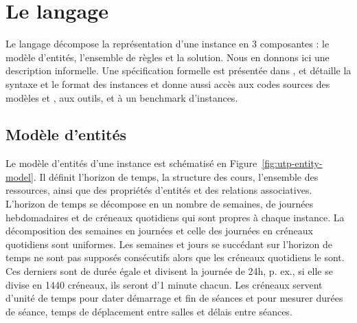 \section{Le langage {\UTP}}
\label{sec:langage-utp}
Le langage {\UTP} décompose la représentation d'une instance 
en 3 composantes : le modèle d'entités, l'ensemble de règles et la solution.
Nous en donnons ici une description informelle. %
Une spécification formelle est présentée dans \cite{uspPATAT22},
et \cite{uspSite}
détaille la syntaxe {\XML} et le format {\JSON} des instances {\UTP}
et donne aussi accès aux codes sources des modèles {\MINIZINC} et {\CHRPP}, aux outils, et à un benchmark d'instances.

\subsection{Modèle d'entités}
\label{sec:entity-model}
Le modèle d'entités d'une instance {\UTP}  est schématisé en Figure~\ref{fig:utp-entity-model}. 
Il définit l'horizon de temps, la structure
des cours, l'ensemble des ressources, ainsi que des propriétés d'entités et des relations associatives.
L'horizon de temps se décompose en un nombre de semaines, de journées hebdomadaires et de créneaux quotidiens qui sont propres à chaque instance.
La décomposition des semaines en journées et celle des journées en créneaux quotidiens sont uniformes.
Les semaines et jours se succédant sur l'horizon de temps ne sont pas supposés consécutifs alors que les créneaux quotidiens le sont.
Ces derniers sont de durée égale et divisent la journée de 24h, p. ex., %
si elle se divise en 1440 créneaux, 
ils seront d'1 minute chacun.
Les créneaux servent d'unité de temps pour dater démarrage et fin de séances et pour mesurer durées de séance, temps de déplacement entre salles et délais entre séances.



